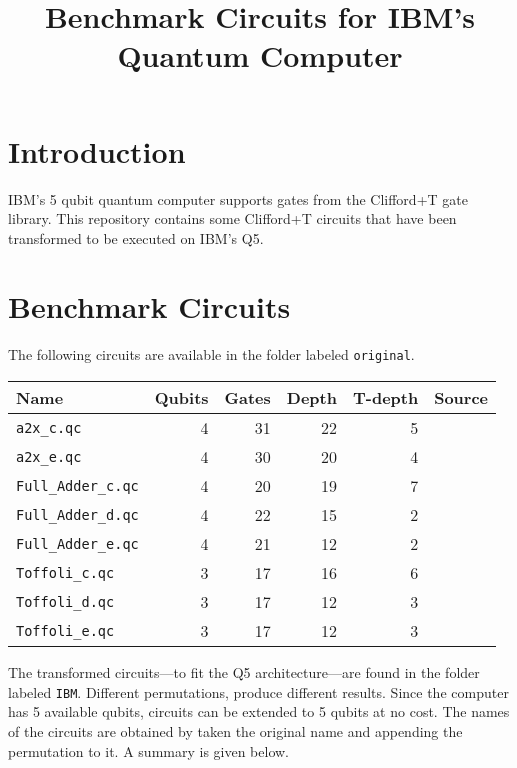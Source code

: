 \documentclass{article}
\begin{document}
\title{Benchmark Circuits for IBM's Quantum Computer}
\date{}
\maketitle

\section{Introduction}
IBM's 5 qubit quantum computer \cite{IBMQ} supports gates from the Clifford+T gate library. 
This repository contains some  Clifford+T circuits that have been transformed to be executed on IBM's Q5.

\section{Benchmark Circuits}

The following circuits are available in the folder labeled {\tt original}.
\vspace{5mm}

\begin{tabular}{|l|r|r|r|r|c|}
   \hline
   Name & Qubits & Gates & Depth & T-depth & Source \\ \hline  \hline
    {\tt a2x\_c.qc} & 4 & 31 & 22 & 5 & \cite{DBLP:conf/rc/MillerSD14}  \\  \hline
    {\tt a2x\_e.qc} & 4 & 30 & 20 & 4 & \cite{DBLP:conf/rc/MillerSD14}  \\  \hline
   {\tt Full\_Adder\_c.qc} & 4 & 20 & 19 & 7 & \cite{DBLP:conf/rc/MillerSD14}  \\  \hline
   {\tt Full\_Adder\_d.qc} & 4 & 22 & 15 & 2 & \cite{DBLP:conf/rc/MillerSD14}  \\  \hline
   {\tt Full\_Adder\_e.qc} & 4 & 21 & 12 & 2 & \cite{DBLP:conf/rc/MillerSD14}  \\  \hline
   {\tt Toffoli\_c.qc} & 3 & 17 & 16 & 6 & \cite{DBLP:conf/rc/MillerSD14}  \\  \hline
   {\tt Toffoli\_d.qc} & 3 & 17 & 12 & 3 & \cite{DBLP:conf/rc/MillerSD14}  \\  \hline
   {\tt Toffoli\_e.qc} & 3 & 17 & 12 & 3 & \cite{DBLP:conf/rc/MillerSD14}  \\  \hline
  \end{tabular} 
  \vspace{5mm}
  
  The transformed circuits---to fit the Q5 architecture---are found in the folder labeled {\tt IBM}.
  Different permutations, produce different results.
  Since the computer has 5 available qubits, circuits can be extended to 5 qubits at no cost.
  The names of the circuits are obtained by taken the original name and appending the permutation to it.
  A summary is given below.
  
\end{document}
